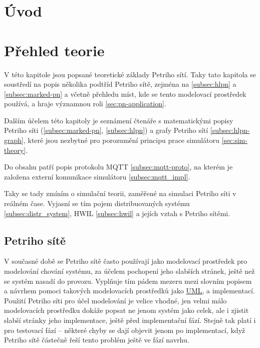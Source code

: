 \chapter{Úvod}
\label{chap:uvod}


\chapter{Přehled teorie}
\label{chapp:prehled}

V této kapitole jsou popsané teoretické základy Petriho sítí. Taky tato kapitola se soustředí na popis několika podtříd Petriho sítě, zejména na  \ref{subsec:hlpn} a  \ref{subsec:marked-pn} a  včetně přehledu míst, kde se tento modelovací prostředek používá, a hraje významnou roli \ref{sec:pn-application}.

Dalším účelem této kapitoly je seznámení čtenáře s matematickými popisy Petriho síti (\ref{subsec:marked-pn}, \ref{subsec:hlpn}) a grafy Petriho sítí \ref{subsec:hlpn-graph}, které jsou nezbytné pro porozumění principu prace simulátoru \ref{sec:sim-theory}.

Do obsahu patří popis protokolu MQTT \ref{subsec:mqtt-proto}, na kterém je založena externí komunikace simulátoru \ref{subsec:mqtt_impl}.

Taky se tady zmíním o simulační teorii, zaměřené na simulaci Petriho síti v reálném čase. Vyjasní se tím pojem distribuovaných systému \ref{subsec:distr_system}, HWIL \ref{subsec:hwil} a jejích vztah s Petriho sítěmi.

\section{Petriho sítě}
V současné době se Petriho sítě často používají jako modelovací prostředek pro modelování chování systému, za účelem pochopení jeho slabších stránek, ještě než se systém nasadí do provozu. Vyplňuje tím pádem mezeru mezi slovním popisem a návrhem pomoci takových modelovacích prostředků jako \href{https://en.wikipedia.org/wiki/Unified_Modeling_Language}{UML}, a implementací. Použití Petriho síti pro účel modelování je velice vhodné, jen velmi málo modelovacích prostředku dokáže popsat ne jenom systém jako celek, ale i zjistit slabší stránky jeho implementace, ještě před implementační fází. Stejně tak platí i pro testovací fází -- některé chyby se dají objevit jenom po implementací, když Petriho sítě částečně řeší tento problém ještě ve fází navrhu.

